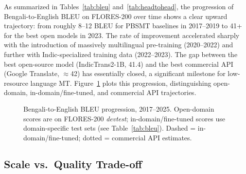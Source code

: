 \documentclass[conference]{IEEEtran}
\begin{document}
As summarized in Tables~\ref{tab:bleu} and~\ref{tab:headtohead}, the progression
of Bengali-to-English BLEU on FLORES-200 over time shows a clear upward trajectory:
from roughly 8--12 BLEU for PBSMT baselines in 2017--2019 to 41+ for the best
open models in 2023.
The rate of improvement accelerated sharply with the introduction of
massively multilingual pre-training (2020--2022) and further with
Indic-specialized training data (2022--2023).
The gap between the best open-source model (IndicTrans2-1B, 41.4) and
the best commercial API (Google Translate, $\approx$42) has essentially
closed, a significant milestone for low-resource language MT.
Figure~\ref{fig:bleu_trend} plots this progression, distinguishing
open-domain, in-domain/fine-tuned, and commercial API trajectories.

\begin{figure}[htbp]
\centering
{}
\caption{Bengali-to-English BLEU progression, 2017--2025. Open-domain scores
are on FLORES-200 \textit{devtest}; in-domain/fine-tuned scores use
domain-specific test sets (see Table~\ref{tab:bleu}). Dashed = in-domain/fine-tuned;
dotted = commercial API estimates.}
\label{fig:bleu_trend}
\end{figure}

\subsection{Scale vs.\ Quality Trade-off}
\end{document}
